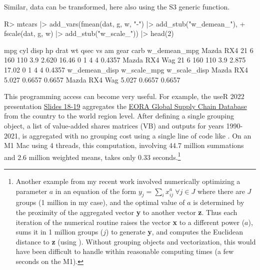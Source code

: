 \documentclass[article]{jss}
\newcommand{\fct}[1]{\code{#1()}}
\begin{document}
%
Similar, data can be transformed, here also using the S3 generic \fct{fscale} function.
%
\begin{Schunk}
\begin{Sinput}
R> mtcars |> add_vars(fmean(dat, g, w, "-") |> add_stub("w_demean_"),
+                     fscale(dat, g, w) |> add_stub("w_scale_")) |> head(2)
\end{Sinput}
\begin{Soutput}
              mpg cyl disp  hp drat    wt  qsec vs am gear carb w_demean_mpg
Mazda RX4      21   6  160 110  3.9 2.620 16.46  0  1    4    4       0.4357
Mazda RX4 Wag  21   6  160 110  3.9 2.875 17.02  0  1    4    4       0.4357
              w_demean_disp w_scale_mpg w_scale_disp
Mazda RX4             5.027      0.6657       0.6657
Mazda RX4 Wag         5.027      0.6657       0.6657
\end{Soutput}
\end{Schunk}
%
This programming access can become very useful. For example, the useR 2022 presentation \href{https://raw.githubusercontent.com/SebKrantz/collapse/master/misc/useR2022\%20presentation/collapse_useR2022_final.pdf}{Slides 18-19} aggregates the \href{https://worldmrio.com/}{EORA Global Supply Chain Database} from the country to the world region level. After defining a single grouping object, a list of value-added shares matrices (VB) and outputs for years 1990-2021, is aggregated with no grouping cost using a single line of code like . On an M1 Mac using 4 threads, this computation, involving 44.7 million summations and 2.6 million weighted means, takes only 0.33 seconds.\footnote{Another example from my recent work involved numerically optimizing a parameter $a$ in an equation of the form $y_j = \sum_i x_{ij}^a\ \forall j\in J$ where there are $J$ groups (1 million in my case), and the optimal value of $a$ is determined by the proximity of the aggregated vector \textbf{y} to another vector \textbf{z}. Thus each iteration of the numerical routine raises the vector \textbf{x} to a different power ($a$), sums it in 1 million groups ($j$) to generate \textbf{y}, and computes the Euclidean distance to \textbf{z} (using ). Without grouping objects and vectorization, this would have been difficult to handle within reasonable computing times (a few seconds on the M1).}
%
\end{document}
